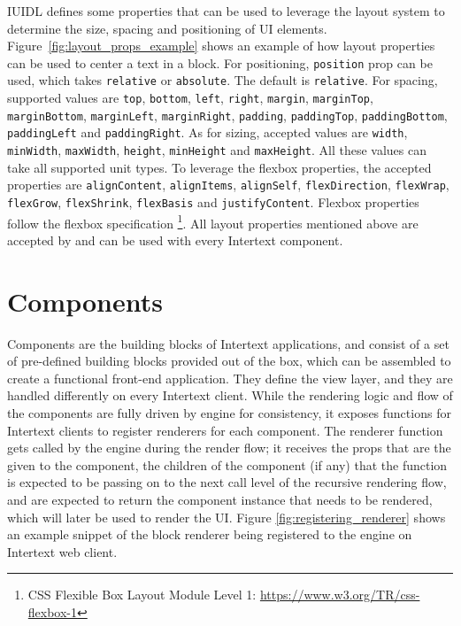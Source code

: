 IUIDL defines some properties that can be used to leverage the layout system to determine the size, spacing and positioning of UI elements. Figure~\ref{fig:layout_props_example} shows an example of how layout properties can be used to center a text in a block. For positioning, \texttt{position} prop can be used, which takes \texttt{relative} or \texttt{absolute}. The default is \texttt{relative}. For spacing, supported values are \texttt{top}, \texttt{bottom}, \texttt{left}, \texttt{right}, \texttt{margin}, \texttt{marginTop}, \texttt{marginBottom}, \texttt{marginLeft}, \texttt{marginRight}, \texttt{padding}, \texttt{paddingTop}, \texttt{paddingBottom}, \texttt{paddingLeft} and \newline \texttt{paddingRight}. As for sizing, accepted values are \texttt{width}, \texttt{minWidth}, \texttt{maxWidth}, \texttt{height}, \texttt{minHeight} and \texttt{maxHeight}. All these values can take all supported unit types. To leverage the flexbox properties, the accepted properties are \texttt{alignContent}, \texttt{alignItems}, \texttt{alignSelf}, \texttt{flexDirection}, \texttt{flexWrap}, \texttt{flexGrow}, \texttt{flexShrink}, \texttt{flexBasis} and \texttt{justifyContent}. Flexbox properties follow the flexbox specification \footnote{CSS Flexible Box Layout Module Level 1: \url{https://www.w3.org/TR/css-flexbox-1}}. All layout properties mentioned above are accepted by and can be used with every Intertext component.

\section{Components}

Components are the building blocks of Intertext applications, and consist of a set of pre-defined building blocks provided out of the box, which can be assembled to create a functional front-end application. They define the view layer, and they are handled differently on every Intertext client. While the rendering logic and flow of the components are fully driven by engine for consistency, it exposes functions for Intertext clients to register renderers for each component. The renderer function gets called by the engine during the render flow; it receives the props that are the given to the component, the children of the component (if any) that the function is expected to be passing on to the next call level of the recursive rendering flow, and are expected to return the component instance that needs to be rendered, which will later be used to render the UI. Figure \ref{fig:registering_renderer} shows an example snippet of the block renderer being registered to the engine on Intertext web client.

